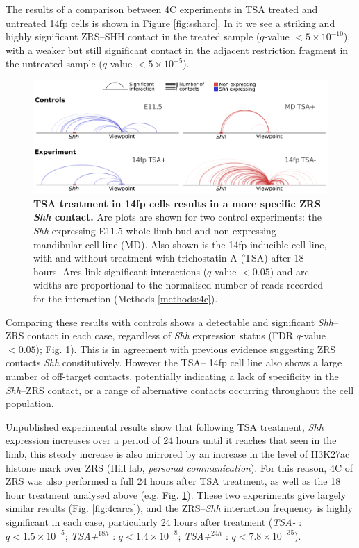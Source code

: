\documentclass[a4paper,11pt,oneside]{book}
\begin{document}
The results of a comparison between 4C experiments in TSA treated and untreated 14fp cells is shown in Figure \ref{fig:ssharc}. In it we see a striking and highly significant ZRS--SHH contact in the treated sample ($q$-value $ < 5 \times 10^{-10}$), with a weaker but still significant contact in the adjacent restriction fragment in the untreated sample ($q$-value $ < 5 \times 10^{-5}$). 

\begin{figure}
\begin{center} 
\includegraphics[width=5.5in]{figs/4c_4way.pdf}
\captionsetup{width=\textwidth} 
\caption[ TSA treatment in 14fp cells results in a more specific ZRS--\emph{Shh} contact. ]{ {\bf TSA treatment in 14fp cells results in a more specific ZRS--\emph{Shh} contact. }
Arc plots are shown for two control experiments: the \emph{Shh} expressing E11.5 whole limb bud and non-expressing mandibular cell line (MD). Also shown is the 14fp inducible cell line, with and without treatment with trichostatin A (TSA) after 18 hours. Arcs link significant interactions ($q$-value $< 0.05$) and arc widths are proportional to the normalised number of reads recorded for the interaction (Methods \ref{methods:4c}).
}\label{fig:4c4way}
\end{center} 
\end{figure} 

Comparing these results with controls shows a detectable and significant \emph{Shh}--ZRS contact in each case, regardless of \emph{Shh} expression status (FDR $q$-value $ < 0.05$); Fig. \ref{fig:4c4way}). This is in agreement with previous evidence suggesting ZRS contacts \emph{Shh} constitutively.\cite{Bouwman2015a} However the TSA-- 14fp cell line also shows a large number of off-target contacts, potentially indicating a lack of specificity in the \emph{Shh}--ZRS contact, or a range of alternative contacts occurring throughout the cell population.

Unpublished experimental results show that following TSA treatment, \emph{Shh} expression increases over a period of 24 hours until it reaches that seen in the limb, this steady increase is also mirrored by an increase in the level of H3K27ac histone mark over ZRS (Hill lab, \emph{personal communication}). For this reason, 4C of ZRS was also performed a full 24 hours after TSA treatment, as well as the 18 hour treatment analysed above (e.g. Fig. \ref{fig:4c4way}). These two experiments give largely similar results (Fig. \ref{fig:4carcs}), and the ZRS--\emph{Shh} interaction frequency is highly significant in each case, particularly 24 hours after treatment (\emph{TSA-} : $ q < 1.5 \times 10^{-5}$; \emph{TSA+}$^{18h}$ : $q < 1.4 \times 10^{-8}$; \emph{TSA+}$^{24h}$ : $ q < 7.8 \times 10^{-35}$).
\end{document}
